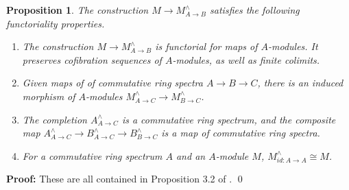 \documentclass[11pt]{article}
\newtheorem{Proposition}{Proposition}[section]
\newenvironment{Proof}{\par\noindent\textbf{Proof:}}
{\qed}
\begin{document}
\begin{Proposition} \label{moreproperties} The construction $M \rightarrow M^{\wedge}_{A \rightarrow B}$ satisfies the following functoriality properties.  
\begin{enumerate} [label=(\arabic*), font=\upshape]
\item{\label{primaryexact} The construction $M \rightarrow M^{\wedge}_{A \rightarrow B} $ is functorial for maps of $A$-modules. It preserves cofibration sequences of $A$-modules, as well as finite colimits.   }
    \item{\label{functormodule} Given maps of  of commutative ring spectra $A \rightarrow B \rightarrow C $,  there is an induced  morphism of $A$-modules $M^{\wedge}_{A \rightarrow C} \rightarrow M^{\wedge}_{B\rightarrow C} $.
    }
    \item{The completion $A^{\wedge}_{A \rightarrow C}$ is a commutative ring spectrum, and the composite map $A^{\wedge}_{A \rightarrow C} \rightarrow B^{\wedge}_{A \rightarrow C} \rightarrow B^{\wedge}_{B \rightarrow C} $ is a map of commutative ring spectra.  }
    \item{For a commutative ring spectrum $A$ and an $A$-module $M$, $M^{\wedge} _{id: A \xrightarrow{}A}\cong M $. }
    
    
\end{enumerate}
    
\end{Proposition}
\begin{Proof}
    These are all contained in Proposition 3.2 of \cite{completion}. 
\end{Proof}
\end{document}
